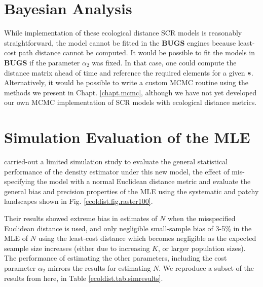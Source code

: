 \section{Bayesian Analysis}

While implementation of these ecological distance SCR models is
reasonably straightforward, the model cannot be fitted
in the  {\bf BUGS} engines because least-cost path distance cannot be computed.
It would be possible to fit the models
in {\bf BUGS} if the parameter $\alpha_{2}$ was fixed. In that case,
one could compute the distance matrix ahead of time and reference the
required elements for a given ${\bf s}$.
Alternatively, it would be possible to write a custom MCMC routine
using the methods we present in Chapt. \ref{chapt.mcmc}, although we
have not yet developed our own MCMC implementation of SCR models with
ecological distance metrics.


\section{Simulation Evaluation of the MLE}

\citet{royle_etal:2012ecol}
carried-out a limited simulation study to evaluate the
general statistical performance of the density estimator under
this new model, the effect of mis-specifying the model with a
normal Euclidean distance metric and evaluate the general bias and
precision properties of the MLE using the systematic and patchy
landscapes shown in
Fig. \ref{ecoldist.fig.raster100}.

Their results showed extreme
bias in estimates of $N$ when the misspecified Euclidean distance is
used, and only negligible small-sample
 bias of 3-5\% in the MLE of $N$ using the
least-cost distance which becomes negligible as the expected seample
size increases (either due to increasing $K$, or larger population sizes).
The performance of estimating the other parameters, including the
cost parameter $\alpha_{2}$ mirrors
the results for estimating $N$.
We reproduce a subset of the results from \citet{royle_etal:2012ecol}
here, in Table \ref{ecoldist.tab.simresults}.

